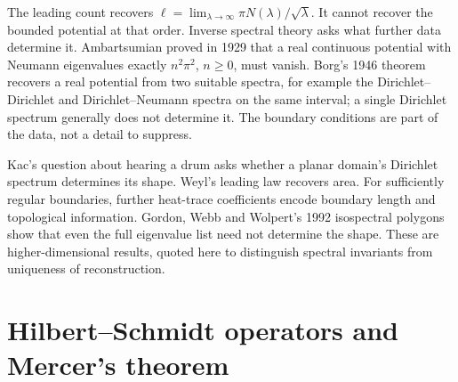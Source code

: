 \begin{think}
The leading count recovers $\ell=\lim_{\lambda\to\infty}\pi N(\lambda)/\sqrt\lambda$. It cannot recover the bounded potential at that order. Inverse spectral theory asks what further data determine it. Ambartsumian proved in 1929 that a real continuous potential with Neumann eigenvalues exactly $n^2\pi^2$, $n\ge0$, must vanish. Borg's 1946 theorem recovers a real potential from two suitable spectra, for example the Dirichlet--Dirichlet and Dirichlet--Neumann spectra on the same interval; a single Dirichlet spectrum generally does not determine it. The boundary conditions are part of the data, not a detail to suppress.
\end{think}

\begin{remark}
Kac's question about hearing a drum asks whether a planar domain's Dirichlet spectrum determines its shape. Weyl's leading law recovers area. For sufficiently regular boundaries, further heat-trace coefficients encode boundary length and topological information. Gordon, Webb and Wolpert's 1992 isospectral polygons show that even the full eigenvalue list need not determine the shape. These are higher-dimensional results, quoted here to distinguish spectral invariants from uniqueness of reconstruction.
\end{remark}

\section{Hilbert--Schmidt operators and Mercer's theorem}

